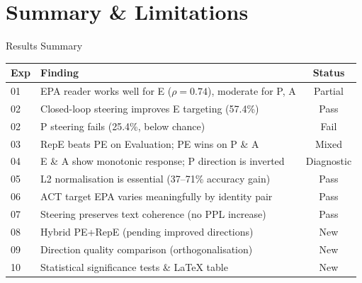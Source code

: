 \documentclass[aspectratio=169,11pt]{beamer}
\begin{document}
\section{Summary \& Limitations}

\begin{frame}{Results Summary}

\begin{center}
\begin{tabular}{lp{6cm}c}
\toprule
\textbf{Exp} & \textbf{Finding} & \textbf{Status} \\
\midrule
01 & EPA reader works well for E ($\rho = 0.74$), moderate for P, A
   & \textcolor{AccentOrange}{Partial} \\
02 & Closed-loop steering improves E targeting (57.4\%)
   & \textcolor{AccentGreen}{Pass} \\
02 & P steering fails (25.4\%, below chance)
   & \textcolor{AccentRed}{Fail} \\
03 & RepE beats PE on Evaluation; PE wins on P \& A
   & \textcolor{AccentOrange}{Mixed} \\
04 & E \& A show monotonic response; P direction is inverted
   & \textcolor{AccentOrange}{Diagnostic} \\
05 & L2 normalisation is essential (37--71\% accuracy gain)
   & \textcolor{AccentGreen}{Pass} \\
06 & ACT target EPA varies meaningfully by identity pair
   & \textcolor{AccentGreen}{Pass} \\
07 & Steering preserves text coherence (no PPL increase)
   & \textcolor{AccentGreen}{Pass} \\
08 & Hybrid PE+RepE (pending improved directions)
   & \textcolor{AccentOrange}{New} \\
09 & Direction quality comparison (orthogonalisation)
   & \textcolor{AccentOrange}{New} \\
10 & Statistical significance tests \& LaTeX table
   & \textcolor{AccentOrange}{New} \\
\bottomrule
\end{tabular}
\end{center}
\end{frame}
\end{document}
